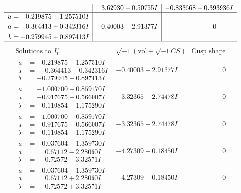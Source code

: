 \documentclass[1p]{elsarticle_modified}
\theoremstyle{definition}
\newcommand{\I}{\sqrt{-1}}
\begin{document}
$$\begin{array}{c|c|c}
 & \phantom{-}3.62930 - 0.50765 I & -0.833668 - 0.393936 I \\ \hline\begin{aligned}
u &= -0.219875 + 1.257510 I \\
a &= \phantom{-}0.364413 + 0.342316 I \\
b &= -0.279945 + 0.897413 I\end{aligned}
 & -0.40003 - 2.91377 I & \phantom{-0.000000 } 0\\
 \hline 
 \end{array}$$\newpage$$\begin{array}{c|c|c}  
\text{Solutions to }I^u_{1}& \I (\text{vol} + \sqrt{-1}CS) & \text{Cusp shape}\\
 \hline 
\begin{aligned}
u &= -0.219875 - 1.257510 I \\
a &= \phantom{-}0.364413 - 0.342316 I \\
b &= -0.279945 - 0.897413 I\end{aligned}
 & -0.40003 + 2.91377 I & \phantom{-0.000000 } 0 \\ \hline\begin{aligned}
u &= -1.000700 + 0.859170 I \\
a &= -0.917675 + 0.566007 I \\
b &= -0.110854 + 1.175290 I\end{aligned}
 & -3.32365 + 2.74478 I & \phantom{-0.000000 } 0 \\ \hline\begin{aligned}
u &= -1.000700 - 0.859170 I \\
a &= -0.917675 - 0.566007 I \\
b &= -0.110854 - 1.175290 I\end{aligned}
 & -3.32365 - 2.74478 I & \phantom{-0.000000 } 0 \\ \hline\begin{aligned}
u &= -0.037604 + 1.359730 I \\
a &= \phantom{-}0.67112 - 2.28060 I \\
b &= \phantom{-}0.72572 - 3.32571 I\end{aligned}
 & -4.27309 + 0.18450 I & \phantom{-0.000000 } 0 \\ \hline\begin{aligned}
u &= -0.037604 - 1.359730 I \\
a &= \phantom{-}0.67112 + 2.28060 I \\
b &= \phantom{-}0.72572 + 3.32571 I\end{aligned}
 & -4.27309 - 0.18450 I & \phantom{-0.000000 } 0 \\ \hline\begin{aligned}

\end{aligned}
\end{array}$$
\end{document}
